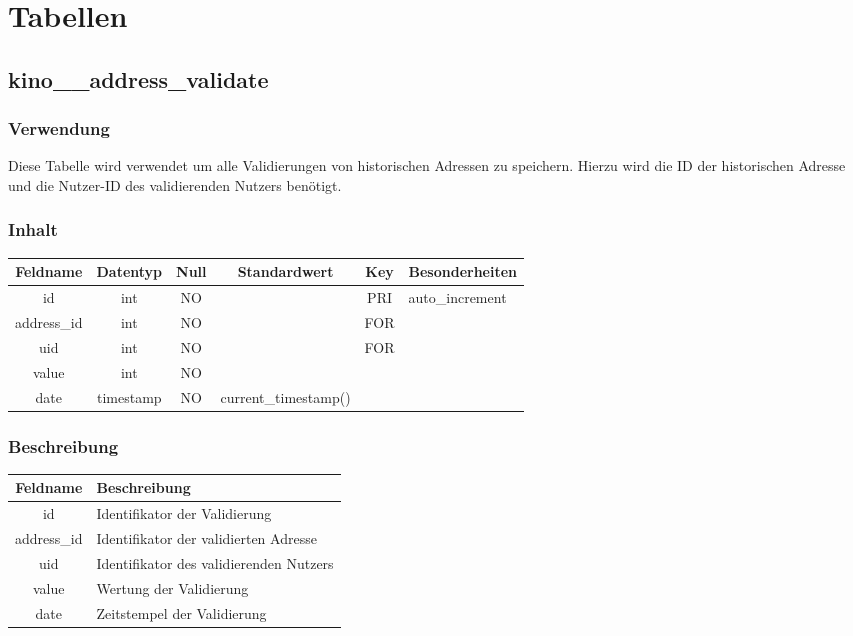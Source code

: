 \section{Tabellen}
\subsection{kino\_\_address\_validate}
\subsubsection{Verwendung} Diese Tabelle wird verwendet um alle Validierungen von historischen Adressen zu speichern. Hierzu wird die ID der historischen Adresse und die Nutzer-ID des validierenden Nutzers benötigt.
\subsubsection{Inhalt}
\begin{table}[H]
	\begin{tabular}{|c|c|c|c|c|p{3.5cm}|}
		\hline
		\textbf{Feldname} & \textbf{Datentyp} & \textbf{Null} & \textbf{Standardwert} & \textbf{Key}   & \textbf{Besonderheiten} \\ \hline
		id & int & NO &  & PRI & auto\_increment  \\ \hline
		address\_id & int & NO &  & FOR &  \\ \hline
		uid & int & NO &  & FOR &  \\ \hline
		value & int & NO &  &  &  \\ \hline
		date & timestamp & NO & current\_timestamp() &  &  \\ \hline
	\end{tabular}
\end{table}
\subsubsection{Beschreibung}
\begin{table}[H]
	\begin{tabular}{|c|p{12cm}|}
		\hline
		\textbf{Feldname} & \textbf{Beschreibung} \\ \hline
		id & Identifikator der Validierung \\ \hline
		address\_id & Identifikator der validierten Adresse \\ \hline
		uid & Identifikator des validierenden Nutzers \\ \hline
		value & Wertung der Validierung \\ \hline
		date & Zeitstempel der Validierung \\ \hline
	\end{tabular}
\end{table}
